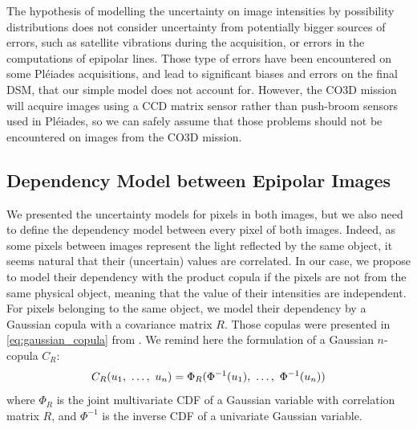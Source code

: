 \begin{remark}
    The hypothesis of modelling the uncertainty on image intensities by possibility distributions does not consider uncertainty from potentially bigger sources of errors, such as satellite vibrations during the acquisition, or errors in the computations of epipolar lines. Those type of errors have been encountered on some Pléiades acquisitions, and lead to significant biases and errors on the final DSM, that our simple model does not account for. However, the CO3D mission will acquire images using a CCD matrix sensor rather than push-broom sensors used in Pléiades, so we can safely assume that those problems should not be encountered on images from the CO3D mission.
\end{remark}

\subsection{Dependency Model between Epipolar Images}
We presented the uncertainty models for pixels in both images, but we also need to define the dependency model between every pixel of both images. Indeed, as some pixels between images represent the light reflected by the same object, it seems natural that their (uncertain) values are correlated. In our case, we propose to model their dependency with the product copula if the pixels are not from the same physical object, meaning that the value of their intensities are independent. For pixels belonging to the same object, we model their dependency by a Gaussian copula with a covariance matrix $R$. Those copulas were presented in \cref{eq:gaussian_copula} from . We remind here the formulation of a Gaussian $n$-copula $C_R$:
\begin{align}
    C_R(u_1 , ~\dots, ~ u_n)=\Phi_R(\Phi^{-1}(u_1) , ~\dots, ~ \Phi^{-1}(u_n))\label{eq:gaussian_copula}
\end{align} where $\Phi_R$ is the joint multivariate CDF of a Gaussian variable with correlation matrix $R$, and $\Phi^{-1}$ is the inverse CDF of a univariate Gaussian variable.

